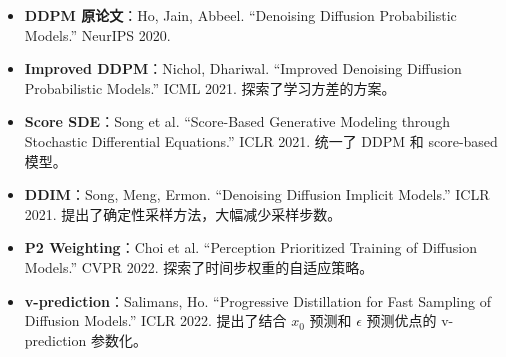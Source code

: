 \begin{itemize}
    \item \textbf{DDPM 原论文}：Ho, Jain, Abbeel. ``Denoising Diffusion Probabilistic Models.'' NeurIPS 2020.
    \item \textbf{Improved DDPM}：Nichol, Dhariwal. ``Improved Denoising Diffusion Probabilistic Models.'' ICML 2021. 探索了学习方差的方案。
    \item \textbf{Score SDE}：Song et al. ``Score-Based Generative Modeling through Stochastic Differential Equations.'' ICLR 2021. 统一了 DDPM 和 score-based 模型。
    \item \textbf{DDIM}：Song, Meng, Ermon. ``Denoising Diffusion Implicit Models.'' ICLR 2021. 提出了确定性采样方法，大幅减少采样步数。
    \item \textbf{P2 Weighting}：Choi et al. ``Perception Prioritized Training of Diffusion Models.'' CVPR 2022. 探索了时间步权重的自适应策略。
    \item \textbf{v-prediction}：Salimans, Ho. ``Progressive Distillation for Fast Sampling of Diffusion Models.'' ICLR 2022. 提出了结合 $x_0$ 预测和 $\epsilon$ 预测优点的 v-prediction 参数化。
\end{itemize}


